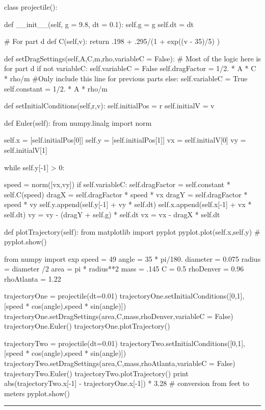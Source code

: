 \begin{enumerate}
\begin{codeexample}
\begin{VerbatimOut}{\listingFile}
class projectile():

    def __init__(self, g = 9.8, dt = 0.1):
        self.g = g
        self.dt = dt

        # For part d
    def C(self,v):
        return .198 + .295/(1 + exp((v - 35)/5) )

    def setDragSettings(self,A,C,m,rho,variableC = False):
        # Most of the logic here is for part d
        if not variableC:
            self.variableC = False
            self.dragFactor = 1/2. * A * C * rho/m  #Only include this line for previous parts
        else:
            self.variableC = True
            self.constant = 1/2. * A * rho/m

        
    def setInitialConditions(self,r,v):
        self.initialPos = r
        self.initialV = v

    def Euler(self):
        from numpy.linalg import norm
        
        self.x = [self.initialPos[0]]
        self.y = [self.initialPos[1]]
        vx = self.initialV[0]
        vy = self.initialV[1]
        
        while self.y[-1] > 0:

            speed = norm([vx,vy])
            if self.variableC:
                self.dragFactor = self.constant * self.C(speed)
            dragX = self.dragFactor * speed * vx
            dragY = self.dragFactor * speed * vy
            self.y.append(self.y[-1] + vy * self.dt)
            self.x.append(self.x[-1] + vx * self.dt)
            vy = vy - (dragY + self.g) * self.dt
            vx = vx - dragX * self.dt

    def plotTrajectory(self):
        from matplotlib import pyplot
        pyplot.plot(self.x,self.y)
        # pyplot.show()


from numpy import exp
speed = 49
angle = 35 * pi/180.
diameter = 0.075
radius = diameter /2
area = pi * radius**2
mass = .145
C = 0.5
rhoDenver = 0.96
rhoAtlanta = 1.22

trajectoryOne = projectile(dt=0.01)
trajectoryOne.setInitialConditions([0,1],[speed * cos(angle),speed * sin(angle)])
trajectoryOne.setDragSettings(area,C,mass,rhoDenver,variableC = False)
trajectoryOne.Euler()
trajectoryOne.plotTrajectory()

trajectoryTwo = projectile(dt=0.01)
trajectoryTwo.setInitialConditions([0,1],[speed * cos(angle),speed * sin(angle)])
trajectoryTwo.setDragSettings(area,C,mass,rhoAtlanta,variableC = False)
trajectoryTwo.Euler()
trajectoryTwo.plotTrajectory()
print abs(trajectoryTwo.x[-1] - trajectoryOne.x[-1]) * 3.28 # conversion from feet to meters
pyplot.show()
\end{VerbatimOut}
\end{codeexample}
\else
\noindent\rule{4 in}{0.01 in}
\fi



\end{enumerate}
